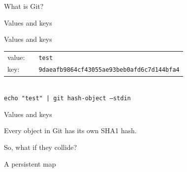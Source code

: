 \documentclass{beamer}
\begin{document}
    \begin{frame}{What is Git?}
        \begin{center}
        \end{center}
    \end{frame}

    \begin{frame}{Values and keys}
        \begin{center}
        \end{center}
    \end{frame}

    \begin{frame}{Values and keys}
        \begin{center}
            \begin{tabular}{@{}l@{}@{}l l@{}}
                value: & & \texttt{test} \\
                key:   & & \texttt{9daeafb9864cf43055ae93beb0afd6c7d144bfa4}
            \end{tabular}
            \\[1em]
            \pause
            \texttt{echo "test" | git hash-object --stdin}
        \end{center}
    \end{frame}

    \begin{frame}{Values and keys}
        \begin{center}
            Every object in \alert{Git} has its own SHA1 hash.
        \end{center}
        \pause
        \begin{center}
            So, what if they collide?
        \end{center}
    \end{frame}

    \begin{frame}{A persistent map}
        \begin{center}
        \end{center}
    \end{frame}
\end{document}
